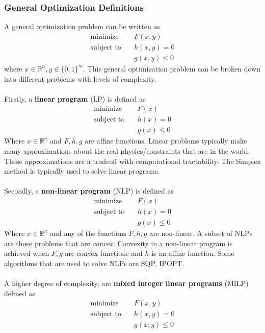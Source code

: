 \subsubsection{General Optimization Definitions}
A general optimization problem can be written as
\begin{align}
  \text{minimize} & \quad F(x,y) \\
  \text{subject to} & \quad h(x,y) = 0 \\
  & \quad g(x,y) \leq 0
\end{align}
where $x \in \mathbb{R}^n, y \in \{ 0,1 \}^m$. This general optimization problem can be broken down into different problems with levels of complexity. \\ \\
Firstly, a \textbf{linear program} (LP) is defined as 
\begin{align}
  \text{minimize} & \quad F(x) \\
  \text{subject to} & \quad h(x) = 0 \\
  & \quad g(x) \leq 0
\end{align}
Where $x \in \mathbb{R}^n$ and $F,h,g$ are affine functions. Linear problems typically make many approximations about the real physics/constraints that are in the world. These approximations are a tradeoff with computational tractability. The Simplex method is typically used to solve linear programs. \\ \\
Secondly, a \textbf{non-linear program}  (NLP) is defined as  
\begin{align}
    \text{minimize} & \quad F(x) \\
    \text{subject to} & \quad h(x) = 0 \\
    & \quad g(x) \leq 0
\end{align}
Where $x \in \mathbb{R}^n$ and any of the functions $F,h,g$ are non-linear. A subset of NLPs are those problems that are \textit{convex}. Convexity in a non-linear program is achieved when $F,g$ are convex functions and $h$ is an affine function. Some algorithms that are used to solve NLPs are SQP, IPOPT. \\ \\
A higher degree of complexity, are \textbf{mixed integer linear programs} (MILP) defined as
\begin{align}
    \text{minimize} & \quad F(x,y) \\
    \text{subject to} & \quad h(x,y) = 0 \\
    & \quad g(x,y) \leq 0
\end{align}
